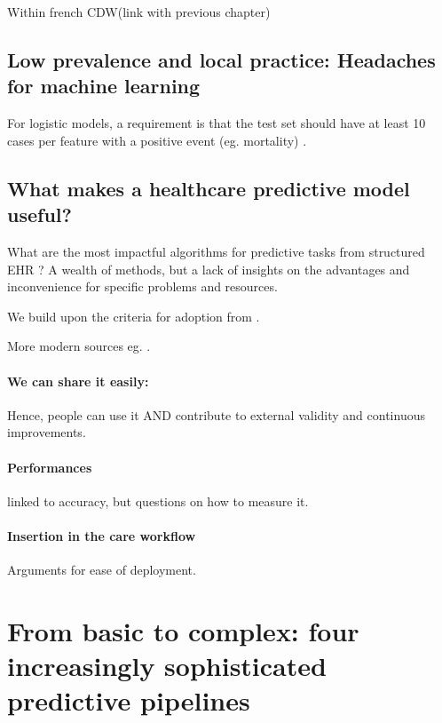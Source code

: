 \documentclass[french,12pt,twoside,a4paper]{book}
\begin{document}
Within french CDW(link with previous chapter)

\subsection{Low prevalence and local practice: Headaches for machine learning}\label{subsec:predictive_models:low_prevalence}

For logistic models, a requirement is that the test set should have at least 10
cases per feature with a positive event (eg. mortality)
\citep{harrell1985regression,wyatt1995commentary}.

\subsection{What makes a healthcare predictive model useful?}\label{subsec:predictive_models:useful}

What are the most impactful algorithms for predictive tasks from structured EHR
? A wealth of methods, but a lack of insights on the advantages and
inconvenience for specific problems and resources.

We build upon the criteria for adoption from \cite{wyatt1995commentary}.

More modern sources eg. \cite{subbaswamy2020development}.

\paragraph{We can share it easily: } Hence, people can use it AND contribute to
external validity and continuous improvements.

\paragraph{Performances} linked to accuracy, but questions on how to measure it.

\paragraph{Insertion in the care workflow}

Arguments for ease of deployment.

\section{From basic to complex: four increasingly sophisticated predictive pipelines}\label{sec:predictive_models:pipelines}
\end{document}

